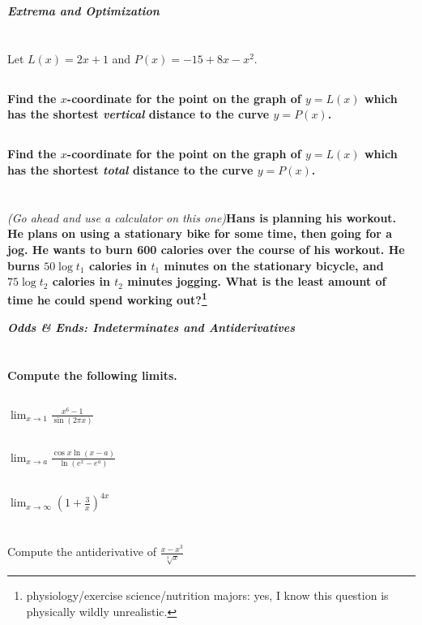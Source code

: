 \documentclass[english]{article}
\newcommand{\prob}[1]{\setcounter{section}{#1-1}\section{}}
\newcommand{\prt}[1]{\setcounter{subsection}{#1-1}\subsection{}}
\theoremstyle{remark}
\theoremstyle{definition}
\newcommand{\ild}[1]{\displaystyle{#1}}
\begin{document}
		
	\begin{center}{\Large\textbf{\emph{Extrema and Optimization}}}\end{center}
	\prob{10} Let $L(x)=2x+1$ and $P(x)=-15+8x-x^2$.
	\prt{1}\textbf{ Find the $x$-coordinate for the point on the graph of $y=L(x)$ which has the shortest \emph{vertical} distance to the curve $y=P(x)$. }\vspace{3.5cm}
	\prt{2}\textbf{ Find the $x$-coordinate for the point on the graph of $y=L(x)$ which has the shortest \emph{total} distance to the curve $y=P(x)$. }\vspace{5cm}
	\prob{11} \emph{(Go ahead and use a calculator on this one\textellipsis)}\newline\textbf{Hans is planning his workout. He plans on using a stationary bike for some time, then going for a jog. He wants to burn 600 calories over the course of his workout. He burns $50\log t_1$ calories in $t_1$ minutes on the stationary bicycle, and $75\log t_2$ calories in $t_2$ minutes jogging. What is the least amount of time he could spend working out?\footnote{physiology/exercise science/nutrition majors: yes, I know this question is physically wildly unrealistic.}}\newpage

	\begin{center}{\Large\textbf{\emph{Odds \& Ends: Indeterminates and Antiderivatives}}}\end{center}
	\prob{12} \textbf{Compute the following limits.}
	\prt{1}$\ild{\lim_{x\to 1}\frac{x^6-1}{\sin(2\pi x)}}$\vspace{3cm}
	\prt{2}$\ild{\lim_{x\to a}\frac{\cos x \ln (x-a)}{\ln(e^x-e^a)}}$\vspace{4cm}
	\prt{3} $\ild{\lim_{x\to \infty} \left(1+\frac{3}{x}\right)^{4x}}$
	\vspace{4cm}
	\prob{13} Compute the antiderivative of $\ild{\frac{x-x^3}{\sqrt[3]{x}}}$
\end{document}
